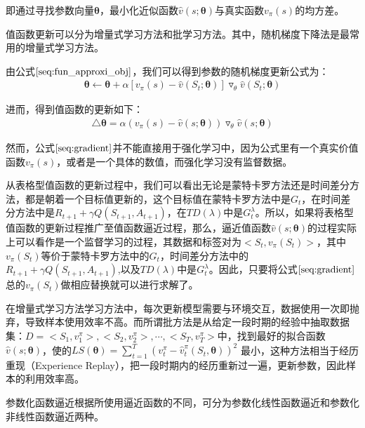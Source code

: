 即通过寻找参数向量$\bm{\theta}$，最小化近似函数$\hat{v}(s;\bm{\theta})$与真实函数$v_{\pi}(s)$的均方差。

值函数更新可以分为增量式学习方法和批学习方法。其中，随机梯度下降法是最常用的增量式学习方法。

由公式$\eqref{seq:fun_approxi_obj}$，我们可以得到参数的随机梯度更新公式为：
\begin{equation}
\begin{aligned}
\bm{\theta} \gets \bm{\theta}+\alpha[v_{\pi}(s)-\hat{v}(S_{t};\bm{\theta})]\triangledown_{\theta} \hat{v}(S_{t};\bm{\theta})
\end{aligned}
\end{equation}

进而，得到值函数的更新如下：
\begin{equation}
\label{seq:gradient}
\begin{aligned}
\triangle \bm{\theta} = \alpha (v_{\pi}(s)-\hat{v}(s;\bm{\theta})) \triangledown_{\theta} \hat{v}(s;\bm
{\theta})
\end{aligned}
\end{equation}

然而，公式$\eqref{seq:gradient}$并不能直接用于强化学习中，因为公式里有一个真实价值函数$v_{\pi}(s)$，或者是一个具体的数值，而强化学习没有监督数据。

从表格型值函数的更新过程中，我们可以看出无论是蒙特卡罗方法还是时间差分方法，都是朝着一个目标值更新的，这个目标值在蒙特卡罗方法中是$G_{t}$，在时间差分方法中是$R_{t+1}+\gamma Q(S_{t+1},A_{t+1})$，在$TD(\lambda)$中是$G^{\lambda}_{t}$。所以，如果将表格型值函数的更新过程推广至值函数逼近过程，那么，逼近值函数$\hat{v}(s;\bm{\theta})$的过程实际上可以看作是一个监督学习的过程，其数据和标签对为$<S_{t}, v_{\pi}(S_{t})>$，其中$v_{\pi}(S_{t})$等价于蒙特卡罗方法中的$G_{t}$，时间差分方法中的$R_{t+1}+\gamma Q(S_{t+1},A_{t+1})$,以及$TD(\lambda)$中是$G^{\lambda}_{t}$。因此，只要将公式$\eqref{seq:gradient}$总的$v_{\pi}(S_{t})$做相应替换就可以进行求解了。

在增量式学习方法学习方法中，每次更新模型需要与环境交互，数据使用一次即抛弃，导致样本使用效率不高。而所谓批方法是从给定一段时期的经验中抽取数据集：$D={<S_{1},v^{\pi}_{1}>,<S_{2},v^{\pi}_{2}>,\cdots,<S_{T},v^{\pi}_{T}>}$中，找到最好的拟合函数$\hat{v}(s;\bm{\theta})$，使的$LS(\bm{\theta})=\sum_{t=1}^{T}(v^{\pi}_{t}-\hat{v}^{\pi}_{t}(S_{t},\bm{\theta}))^2$ 最小，这种方法相当于经历重现（Experience Replay），把一段时期内的经历重新过一遍，更新参数，因此样本的利用效率高。

参数化函数逼近根据所使用逼近函数的不同，可分为参数化线性函数逼近和参数化非线性函数逼近两种。

